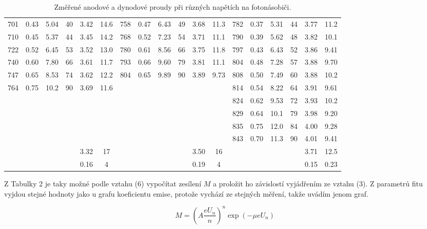 \documentclass[a4paper,11pt]{article}
\begin{document}
\begin{table}[htpb]
{\begin{tabular}{ | c c c c c c | c c c c c c | c c c c c c |}
        701 & 0.43 & 5.04 & 40 & 3.42 & 14.6 & 758 & 0.47 & 6.43 & 49 & 3.68 & 11.3 & 782 & 0.37 & 5.31 & 44 & 3.77 & 11.2 \\
        710 & 0.45 & 5.37 & 44 & 3.45 & 14.2 & 768 & 0.52 & 7.23 & 54 & 3.71 & 11.1 & 790 & 0.39 & 5.62 & 48 & 3.82 & 10.1 \\
        722 & 0.52 & 6.45 & 53 & 3.52 & 13.0 & 780 & 0.61 & 8.56 & 66 & 3.75 & 11.8 & 797 & 0.43 & 6.43 & 52 & 3.86 & 9.41 \\
        740 & 0.60 & 7.80 & 66 & 3.61 & 11.7 & 793 & 0.66 & 9.60 & 79 & 3.81 & 11.1 & 804 & 0.48 & 7.28 & 57 & 3.88 & 9.70 \\
        747 & 0.65 & 8.53 & 74 & 3.62 & 12.2 & 804 & 0.65 & 9.89 & 90 & 3.89 & 9.73 & 808 & 0.50 & 7.49 & 60 & 3.88 & 10.2 \\
        764 & 0.75 & 10.2 & 90 & 3.69 & 11.6 &     &      &      &    &      &      & 814 & 0.54 & 8.22 & 64 & 3.91 & 9.61 \\
            &      &      &    &      &      &     &      &      &    &      &      & 824 & 0.62 & 9.53 & 72 & 3.93 & 10.2 \\
            &      &      &    &      &      &     &      &      &    &      &      & 829 & 0.64 & 10.1 & 79 & 3.98 & 9.20 \\
            &      &      &    &      &      &     &      &      &    &      &      & 835 & 0.75 & 12.0 & 84 & 4.00 & 9.28 \\
            &      &      &    &      &      &     &      &      &    &      &      & 843 & 0.70 & 11.3 & 90 & 4.01 & 9.41 \\
        \hline     
            & & & & 3.32 & 17 & & & & & 3.50 & 16 & & & & & 3.71 & 12.5 \\
            & & & & 0.16 & 4  & & & & & 0.19 & 4  & & & & & 0.15 & 0.23 \\ 
            \hline

    \end{tabular}  
    }
    \caption{Změřené anodové a dynodové proudy při různých napětích na fotonásobiči.}
\end{table}        

Z Tabulky 2 je taky možné podle vztahu (6) vypočítat zesílení $ M $ a proložit ho závislostí vyjádřením ze vztahu (3). Z parametrů fitu vyjdou stejné hodnoty jako u grafu koeficientu emise, protože vychází ze stejných měření, takže uvádím jenom graf. 

\begin{equation}
M = \left( A\frac{eU_n}{n} \right)^{n} \exp ( -\mu eU_n)
\end{equation}
\end{document}
